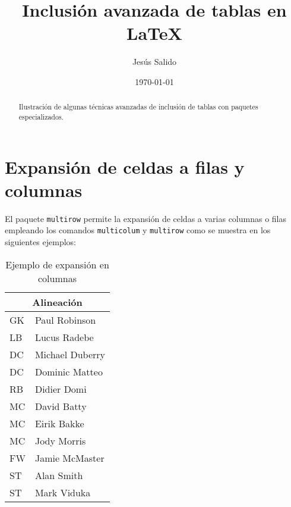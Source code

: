 \documentclass[11pt,a4paper]{article}
\author{Jesús Salido}
\title{Inclusión avanzada de tablas en \LaTeX{}}
\date{\today}
\begin{document}
\maketitle


\begin{abstract}
	Ilustración de algunas técnicas avanzadas de inclusión de tablas con paquetes especializados.
\end{abstract}

\tableofcontents


\renewcommand{\listtablename}{Índice de tablas} %
\renewcommand{\tablename}{Tabla} %
\listoftables




\section{Expansión de celdas a filas y columnas}
El paquete \texttt{multirow} permite la expansión de celdas a varias columnas o filas empleando los comandos \texttt{multicolum} y \texttt{multirow} como se muestra en los siguientes ejemplos:

\begin{table}[hbt]%
	\centering
	\caption{Ejemplo de expansión en columnas}
	\label{tab:expcolumnas}
	\begin{tabular}{|l|l|} %
	\hline
	\multicolumn{2}{|c|}{Alineación} \\
	\hline
	GK & Paul Robinson \\
	LB & Lucus Radebe \\
	DC & Michael Duberry \\
	DC & Dominic Matteo \\
	RB & Didier Domi \\
	MC & David Batty \\
	MC & Eirik Bakke \\
	MC & Jody Morris \\
	FW & Jamie McMaster \\
	ST & Alan Smith \\
	ST & Mark Viduka \\
	\hline
	\end{tabular}
\end{table}


\end{document}
